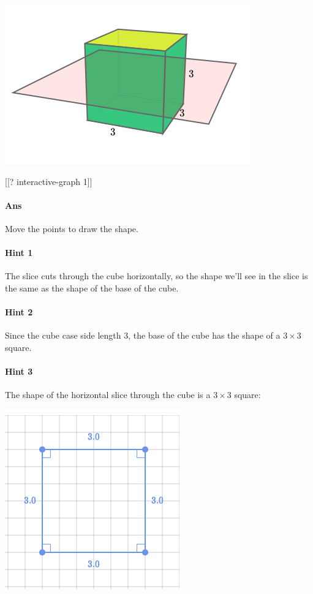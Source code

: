 \documentclass[twocolumn,10pt]{article}
\def\shrinkfactor{0.4}
\begin{document}
\includegraphics[scale=\shrinkfactor]{figures/f0b7654c0b53908504fb120f51f2b50f3f8fd955.png}

[[? interactive-graph 1]]


\paragraph{Ans} Move the points to draw the shape. 

\paragraph{Hint 1}The slice cuts through the cube horizontally, so the shape we'll see in the slice is the same as the shape of the base of the cube.

\paragraph{Hint 2}Since the cube case side length $3$, the base of the cube has the shape of a $3 \times 3$ square. 


\paragraph{Hint 3}The shape of the horizontal slice through the cube is a $3 \times 3$ square:  

\includegraphics[scale=\shrinkfactor]{figures/225c50ae63dfe1e1e5efd66c940ebfbbd9e44ca2.png}
\end{document}
